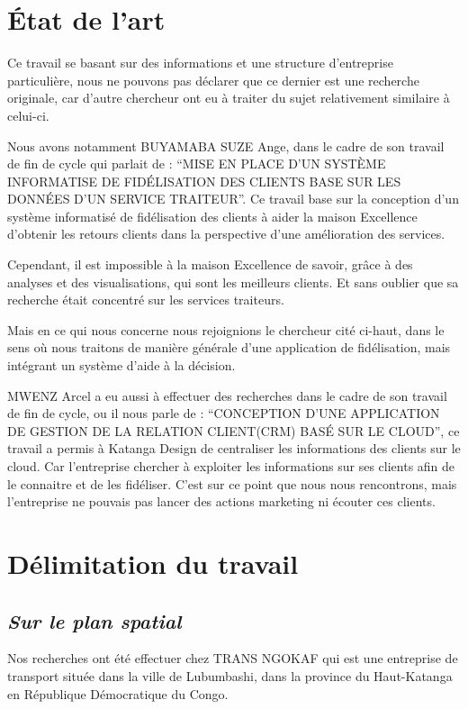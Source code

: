     \section[Etat de l'art]{État de l’art} %
    Ce travail se basant sur des informations et une structure d’entreprise particulière, nous ne
    pouvons pas déclarer que ce dernier est une recherche originale, car d’autre chercheur ont eu
    à traiter du sujet relativement similaire à celui-ci.
    \par
    Nous avons notamment BUYAMABA SUZE Ange, dans le cadre de son travail de fin de cycle
    qui parlait de : \enquote{MISE EN PLACE D’UN SYSTÈME INFORMATISE DE FIDÉLISATION DES 
    CLIENTS BASE SUR LES DONNÉES D’UN SERVICE TRAITEUR}. Ce travail base sur la conception
    d’un système informatisé de fidélisation des clients à aider la maison Excellence
    d’obtenir les retours clients dans la perspective d’une amélioration des services.
    \cite{Buyamba2017}
    \par
    Cependant, il est impossible à la maison Excellence de savoir, grâce à des analyses
    et des visualisations, qui sont les meilleurs clients. Et sans oublier que sa recherche
    était concentré sur les services traiteurs. 
    \par
    Mais en ce qui nous concerne nous rejoignions le chercheur cité ci-haut, dans le sens
    où nous traitons de manière générale d’une application de fidélisation, mais intégrant
    un système d’aide à la décision.
    \par
    MWENZ Arcel a eu aussi à effectuer des recherches dans le cadre de son 
    travail de fin de cycle, ou il nous parle de : \enquote{CONCEPTION D’UNE APPLICATION
    DE GESTION DE LA RELATION CLIENT(CRM) BASÉ SUR LE CLOUD}, ce travail a permis à Katanga 
    Design de centraliser les informations des clients sur le cloud. Car l’entreprise chercher
    à exploiter les informations sur ses clients afin de le connaitre et de les fidéliser. \cite*{Mwenz2017}
    C’est sur ce point que nous nous rencontrons, mais l’entreprise ne pouvais pas lancer
    des actions marketing ni écouter ces clients. 
    \section[Délimitation du travail]{Délimitation du travail}
        \subsection[Sur le plan spatial]{\textit{Sur le plan spatial}}
        Nos recherches ont été effectuer chez TRANS NGOKAF qui est une entreprise de transport
        située dans la ville de Lubumbashi, dans la province du Haut-Katanga en République Démocratique du Congo.
